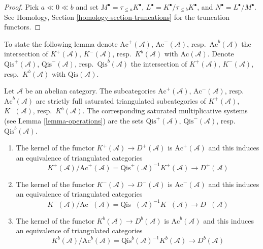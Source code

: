 \begin{proof}
Pick $a \ll 0 \ll b$ and set $M^\bullet = \tau_{\leq a}K^\bullet$,
$L^\bullet = K^\bullet/\tau_{\leq b}K^\bullet$, and
$N^\bullet = L^\bullet/M^\bullet$.
See
Homology, Section \ref{homology-section-truncations}
for the truncation functors.
\end{proof}

\noindent
To state the following lemma denote
$\text{Ac}^{+}(\mathcal{A})$, $\text{Ac}^{-}(\mathcal{A})$,
resp.\ $\text{Ac}^b(\mathcal{A})$ the intersection of
$K^{+}(\mathcal{A})$, $K^{-}(\mathcal{A})$, resp.\ $K^b(\mathcal{A})$
with $\text{Ac}(\mathcal{A})$.
Denote $\text{Qis}^{+}(\mathcal{A})$, $\text{Qis}^{-}(\mathcal{A})$,
resp.\ $\text{Qis}^b(\mathcal{A})$ the intersection of
$K^{+}(\mathcal{A})$, $K^{-}(\mathcal{A})$, resp.\ $K^b(\mathcal{A})$
with $\text{Qis}(\mathcal{A})$.

\begin{lemma}
\label{lemma-bounded-derived}
Let $\mathcal{A}$ be an abelian category. The subcategories
$\text{Ac}^{+}(\mathcal{A})$, $\text{Ac}^{-}(\mathcal{A})$,
resp.\ $\text{Ac}^b(\mathcal{A})$
are strictly full saturated triangulated subcategories
of $K^{+}(\mathcal{A})$, $K^{-}(\mathcal{A})$, resp.\ $K^b(\mathcal{A})$.
The corresponding saturated multiplicative systems (see
Lemma \ref{lemma-operations})
are the sets $\text{Qis}^{+}(\mathcal{A})$, $\text{Qis}^{-}(\mathcal{A})$,
resp.\ $\text{Qis}^b(\mathcal{A})$.
\begin{enumerate}
\item The kernel of the functor $K^{+}(\mathcal{A}) \to D^{+}(\mathcal{A})$
is $\text{Ac}^{+}(\mathcal{A})$ and this induces an equivalence
of triangulated categories
$$
K^{+}(\mathcal{A})/\text{Ac}^{+}(\mathcal{A}) =
\text{Qis}^{+}(\mathcal{A})^{-1}K^{+}(\mathcal{A})
\longrightarrow
D^{+}(\mathcal{A})
$$
\item The kernel of the functor $K^{-}(\mathcal{A}) \to D^{-}(\mathcal{A})$
is $\text{Ac}^{-}(\mathcal{A})$ and this induces an equivalence
of triangulated categories
$$
K^{-}(\mathcal{A})/\text{Ac}^{-}(\mathcal{A}) =
\text{Qis}^{-}(\mathcal{A})^{-1}K^{-}(\mathcal{A})
\longrightarrow
D^{-}(\mathcal{A})
$$
\item The kernel of the functor $K^b(\mathcal{A}) \to D^b(\mathcal{A})$
is $\text{Ac}^b(\mathcal{A})$ and this induces an equivalence
of triangulated categories
$$
K^b(\mathcal{A})/\text{Ac}^b(\mathcal{A}) =
\text{Qis}^b(\mathcal{A})^{-1}K^b(\mathcal{A})
\longrightarrow
D^b(\mathcal{A})
$$
\end{enumerate}
\end{lemma}

